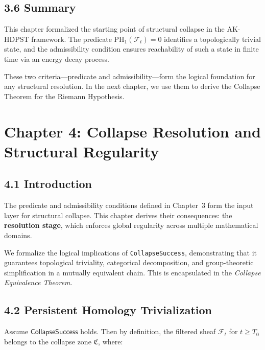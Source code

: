 \documentclass[11pt]{article}
\begin{document}
\subsection*{3.6 Summary}

This chapter formalized the starting point of structural collapse in the AK-HDPST framework. The predicate \( \mathrm{PH}_1(\mathcal{F}_t) = 0 \) identifies a topologically trivial state, and the admissibility condition ensures reachability of such a state in finite time via an energy decay process.

These two criteria—predicate and admissibility—form the logical foundation for any structural resolution. In the next chapter, we use them to derive the Collapse Theorem for the Riemann Hypothesis.



\section*{Chapter 4: Collapse Resolution and Structural Regularity}

\subsection*{4.1 Introduction}

The predicate and admissibility conditions defined in Chapter~3 form the input layer for structural collapse. This chapter derives their consequences: the \textbf{resolution stage}, which enforces global regularity across multiple mathematical domains.

We formalize the logical implications of \texttt{CollapseSuccess}, demonstrating that it guarantees topological triviality, categorical decomposition, and group-theoretic simplification in a mutually equivalent chain. This is encapsulated in the \emph{Collapse Equivalence Theorem}.

\subsection*{4.2 Persistent Homology Trivialization}

Assume \( \mathsf{CollapseSuccess} \) holds. Then by definition, the filtered sheaf \( \mathcal{F}_t \) for \( t \geq T_0 \) belongs to the collapse zone \( \mathfrak{C} \), where:
\end{document}
